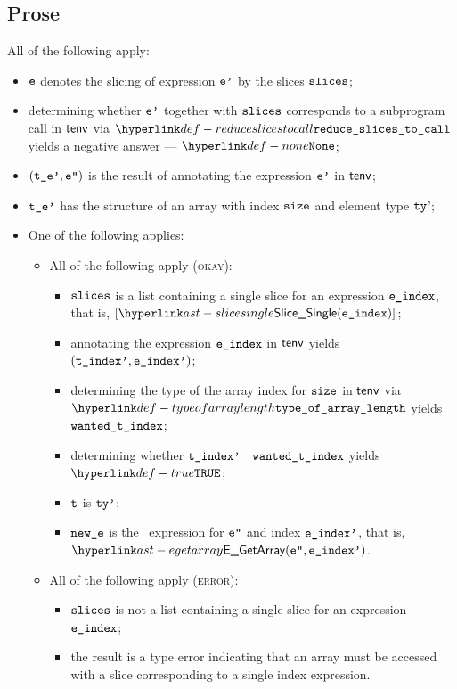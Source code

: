 \subsection{Prose}
All of the following apply:
\begin{itemize}
  \item $\texttt{e}$ denotes the slicing of expression $\texttt{e'}$ by the slices $\texttt{slices}$;
  \item determining whether $\texttt{e'}$ together with $\texttt{slices}$ corresponds to a subprogram call
        in $\textsf{tenv}$ via $\reduceslicestocall$ yields a negative answer --- $\None$\ProseOrTypeError;
  \item $(\texttt{t\_e'},\texttt{e''})$ is the result of annotating the expression $\texttt{e'}$ in $\textsf{tenv}$;
  \item $\texttt{t\_e'}$ has the structure of an array with index $\texttt{size}$ and element type $\texttt{ty}$';
  \item One of the following applies:
  \begin{itemize}
    \item All of the following apply (\textsc{okay}):
    \begin{itemize}
      \item $\texttt{slices}$ is a list containing a single slice for an expression $\texttt{e\_index}$, that is, $[\SliceSingle(\eindex)]$;
      \item annotating the expression $\texttt{e\_index}$ in $\textsf{tenv}$ yields $(\texttt{t\_index'}, \texttt{e\_index'})$\ProseOrTypeError;
      \item determining the type of the array index for $\texttt{size}$ in $\textsf{tenv}$ via \\ $\typeofarraylength$
            yields $\texttt{wanted\_t\_index}$;
      \item determining whether $\texttt{t\_index'}$ \typesatisfies\ $\texttt{wanted\_t\_index}$ yields \\
            $\True$\ProseOrTypeError;
      \item $\texttt{t}$ is $\texttt{ty'}$;
      \item $\texttt{new\_e}$ is the \arrayaccess\ expression for $\texttt{e''}$ and index $\texttt{e\_index'}$, that is, $\EGetArray(\vepp, \eindexp)$.
    \end{itemize}

    \item All of the following apply (\textsc{error}):
    \begin{itemize}
      \item $\texttt{slices}$ is not a list containing a single slice for an expression $\texttt{e\_index}$;
      \item the result is a type error indicating that an array must be accessed with a slice corresponding
            to a single index expression.
    \end{itemize}
  \end{itemize}
\end{itemize}

